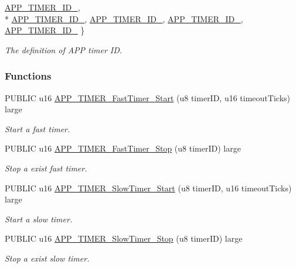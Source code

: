 \begin{DoxyCompactItemize}
\hyperlink{group___t_i_m_e_r_gga066b1254d4f15cdbcfecca34eff53308a015c18be7d5f478399896ba8a9bd1e82}{A\+P\+P\+\_\+\+T\+I\+M\+E\+R\+\_\+\+I\+D\+\_}, 
\\*
\hyperlink{group___t_i_m_e_r_gga066b1254d4f15cdbcfecca34eff53308ab04aa1339b89c04c0f8e332d5679d347}{A\+P\+P\+\_\+\+T\+I\+M\+E\+R\+\_\+\+I\+D\+\_}, 
\hyperlink{group___t_i_m_e_r_gga066b1254d4f15cdbcfecca34eff53308a1509bc83a5e937d21560655d436ce8f5}{A\+P\+P\+\_\+\+T\+I\+M\+E\+R\+\_\+\+I\+D\+\_}, 
\hyperlink{group___t_i_m_e_r_gga066b1254d4f15cdbcfecca34eff53308a958ba931426c502e1c2035ac80fef345}{A\+P\+P\+\_\+\+T\+I\+M\+E\+R\+\_\+\+I\+D\+\_}, 
\hyperlink{group___t_i_m_e_r_gga066b1254d4f15cdbcfecca34eff53308ada5f99eea91c2f428f6156c3feb569ec}{A\+P\+P\+\_\+\+T\+I\+M\+E\+R\+\_\+\+I\+D\+\_}
 \}\begin{DoxyCompactList}\small\item\em The definition of A\+PP timer ID. \end{DoxyCompactList}
\end{DoxyCompactItemize}
\subsubsection*{Functions}
\begin{DoxyCompactItemize}
\item 
P\+U\+B\+L\+IC u16 \hyperlink{group___t_i_m_e_r_ga23e51e52f5db5858b6164d53f4d71265}{A\+P\+P\+\_\+\+T\+I\+M\+E\+R\+\_\+\+Fast\+Timer\+\_\+\+Start} (u8 timer\+ID, u16 timeout\+Ticks) large
\begin{DoxyCompactList}\small\item\em Start a fast timer. \end{DoxyCompactList}\item 
P\+U\+B\+L\+IC u16 \hyperlink{group___t_i_m_e_r_ga97146a8dc858ca49ad475d3c7cd763ba}{A\+P\+P\+\_\+\+T\+I\+M\+E\+R\+\_\+\+Fast\+Timer\+\_\+\+Stop} (u8 timer\+ID) large
\begin{DoxyCompactList}\small\item\em Stop a exist fast timer. \end{DoxyCompactList}\item 
P\+U\+B\+L\+IC u16 \hyperlink{group___t_i_m_e_r_gac6c391d197abb2ad76f9767e53c151ec}{A\+P\+P\+\_\+\+T\+I\+M\+E\+R\+\_\+\+Slow\+Timer\+\_\+\+Start} (u8 timer\+ID, u16 timeout\+Ticks) large
\begin{DoxyCompactList}\small\item\em Start a slow timer. \end{DoxyCompactList}\item 
P\+U\+B\+L\+IC u16 \hyperlink{group___t_i_m_e_r_ga3d6cc0d516620612994df0a6d49e6103}{A\+P\+P\+\_\+\+T\+I\+M\+E\+R\+\_\+\+Slow\+Timer\+\_\+\+Stop} (u8 timer\+ID) large
\begin{DoxyCompactList}\small\item\em Stop a exist slow timer. \end{DoxyCompactList}\end{DoxyCompactItemize}


